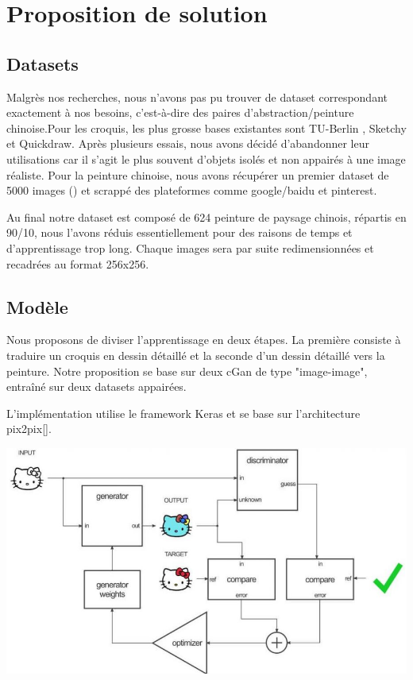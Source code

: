 \documentclass[a4paper, 12pt]{report}
\begin{document}
\chapter{Proposition de solution}



\section{Datasets}

Malgrès nos recherches, nous n'avons pas pu trouver de dataset correspondant exactement à nos besoins, c'est-à-dire des paires d'abstraction/peinture chinoise.Pour les croquis, les plus grosse bases existantes sont TU-Berlin \cite{eitz2012hdhso}, Sketchy \cite{sketchy2016} et Quickdraw. Après plusieurs essais, nous avons décidé d'abandonner leur utilisations car il s'agit le plus souvent d'objets isolés et non appairés à une image réaliste. Pour la peinture chinoise, nous avons récupérer un premier dataset de 5000 images (\cite{ychen93}) et scrappé des plateformes comme google/baidu et pinterest. 


Au final notre dataset est composé de 624 peinture de paysage chinois, répartis en 90/10, nous l'avons réduis essentiellement pour des raisons de temps et d'apprentissage trop long. Chaque images sera par suite redimensionnées et recadrées au format 256x256.


\section{Modèle}
Nous proposons de diviser l'apprentissage en deux étapes. La première consiste à traduire un croquis en dessin détaillé et la seconde d'un dessin détaillé vers la peinture. Notre proposition se base sur deux cGan de type "image-image", entraîné sur deux datasets appairées.


L'implémentation utilise le framework Keras et se base sur l'architecture pix2pix[].

\begin{center}
  \centering
    \includegraphics[width=0.8\linewidth]{images/pix2pix.jpg}
\end{center}
\end{document}
